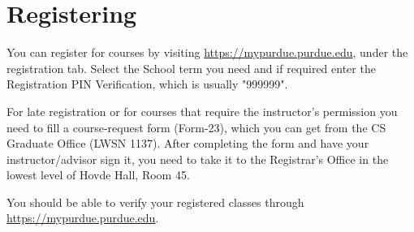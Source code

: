 \section{Registering}

You can register for courses by visiting \url{https://mypurdue.purdue.edu}, under the registration tab. Select the School term you need and if required enter the Registration PIN Verification, which is usually "999999".

For late registration or for courses that require the instructor's permission you need to fill a course-request form (Form-23), which you can get from the CS Graduate Office (LWSN 1137). After completing the form and have your instructor/advisor sign it, you need to take it to the Registrar's Office in the lowest level of Hovde Hall, Room 45.

You should be able to verify your registered classes through \url{https://mypurdue.purdue.edu}.